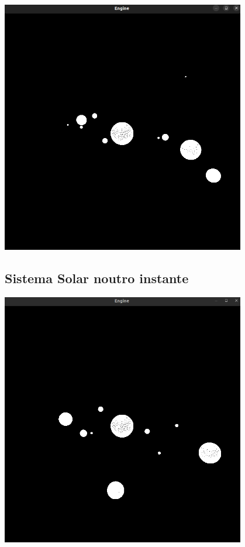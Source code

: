 \begin{center}
    \includegraphics[width=0.8\textwidth]{imgs/sisolar1.png}
    \label{fig:sisolar1}
\end{center}

\subsection{Sistema Solar noutro instante}

\begin{center}
    \includegraphics[width=0.8\textwidth]{imgs/sisolar2.png}
    \label{fig:sisolar2}
\end{center}

